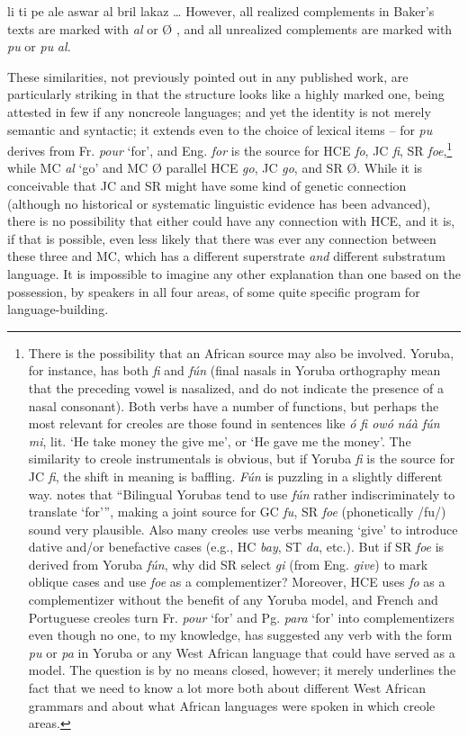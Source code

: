 \ea\label{ex:2:38}
 li ti pe ale aswar al bril lakaz \ldots 
\z
However, all realized complements in Baker's texts are marked with \textit{al} or {\O} , and all unrealized complements are marked with \textit{pu} or \textit{pu} \textit{al.}

These similarities, not previously pointed out in any published work, are particularly striking in that the structure looks like a highly marked one, being attested in few if any noncreole languages; and yet the identity is not merely semantic and syntactic; it extends even to the choice of lexical items -- for \textit{pu} derives from Fr. \textit{pour} `for', and Eng. \textit{for} is the source for HCE \textit{fo}, JC \textit{fi}, SR \textit{foe},\footnote{There is the possibility that an African source may also be involved. Yoruba, for instance, has both \textit{fi} and \textit{f{\'u}n} (final nasals in Yoruba orthography mean that the preceding vowel is nasalized, and do not indicate the presence of a nasal consonant). Both verbs have a number of functions, but perhaps the most relevant for creoles are those found in sentences like \textit{{\'o} fi ow{\'o} n\'a\`a f\'un mi}, lit. `He take money the give me', or `He gave me the money'. The similarity to creole instrumentals is obvious, but if Yoruba \textit{fi} is the source for JC \textit{fi}, the shift in meaning is baffling. \textit{F\'un} is puzzling in a slightly different way. \citet{Rowlands1969} notes that ``Bilingual Yorubas tend to use \textit{f\'un} rather indiscriminately to translate `for''', making a joint source for GC \textit{fu}, SR \textit{foe} (phonetically /fu/) sound very plausible. Also many creoles use %
verbs meaning `give' to introduce dative and/or benefactive cases (e.g., HC \textit{bay}, ST \textit{da}, etc.). But if SR \textit{foe} is derived from Yoruba \textit{f\'un}, why did SR select \textit{gi} (from Eng. \textit{give}) to mark oblique cases and use \textit{foe} as a complementizer? Moreover, HCE uses \textit{fo} as a complementizer without the benefit of any Yoruba model, and French and Portuguese creoles turn Fr. \textit{pour} `for' and Pg. \textit{para} `for' into complementizers even though no one, to my knowledge, has suggested any verb with the form \textit{pu} or \textit{pa} in Yoruba or any West African language that could have served as a model. The question is by no means closed, however; it merely underlines the fact that we need to know a lot more both about different West African grammars and about what African lan\-guages were spoken in which creole areas.} while MC \textit{al} `go' and MC {\O} parallel HCE \textit{go}, JC \textit{go}, and SR {\O}. While it is conceivable that JC and SR might have some kind of genetic connection (although no historical or systematic linguistic evidence has been advanced), there is no possi\-bility that either could have any connection with HCE, and it is, if that is possible, even less likely that there was ever any connection between these three and MC, which has a different superstrate \textit{and} different substratum language. It is impossible to imagine any other
explanation than one based on the possession, by speakers in all four areas, of some quite specific program for language-building.

